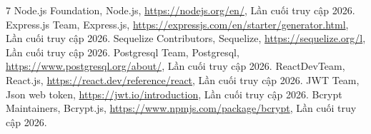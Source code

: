 \documentclass[../DoAn.tex]{subfiles}
\begin{document}
\newpage
\renewcommand{\bibname}{TÀI LIỆU THAM KHẢO}
{}
\begin{thebibliography}{7}
 Node.js Foundation, Node.js, \url{https://nodejs.org/en/}, Lần cuối truy cập 2026.
 Express.js Team, Express.js, \url{https://expressjs.com/en/starter/generator.html}, Lần cuối truy cập 2026.
 Sequelize Contributors, Sequelize, \url{https://sequelize.org/l}, Lần cuối truy cập 2026.
 Postgresql Team, Postgresql, \url{https://www.postgresql.org/about/}, Lần cuối truy cập 2026.
 ReactDevTeam, React.js, \url{https://react.dev/reference/react}, Lần cuối truy cập 2026.
 JWT Team, Json web token, \url{https://jwt.io/introduction}, Lần cuối truy cập 2026.
 Bcrypt Maintainers, Bcrypt.js, \url{https://www.npmjs.com/package/bcrypt}, Lần cuối truy cập 2026.
\end{thebibliography}
\end{document}

